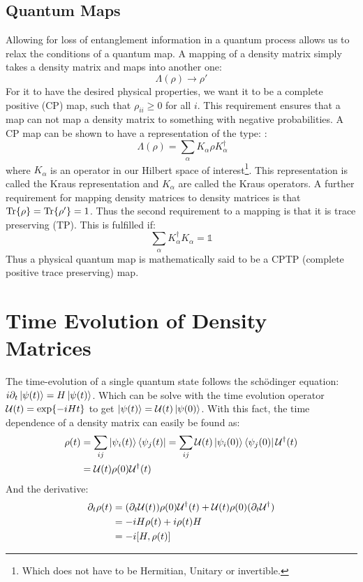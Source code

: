 \subsection{Quantum Maps}
Allowing for loss of entanglement information in a quantum process allows us to relax the conditions of a quantum map. A mapping of a density matrix simply takes a density matrix and maps into another one:
\begin{equation}
    \Lambda(\rho) \to \rho'
\end{equation}
For it to have the desired physical properties, we want it to be a complete positive (CP) map, such that $\rho_{ii} \geq 0$ for all $i$. This requirement ensures that a map can not map a density matrix to something with negative probabilities. A CP map can be shown to have a representation of the type: \cite{greenbaum_introduction_2015}:
\begin{equation}\
    \Lambda(\rho) = \sum_\alpha K_\alpha\rho K_\alpha^\dagger
\end{equation}
where $K_\alpha$ is an operator in our Hilbert space of interest\footnote{Which does not have to be Hermitian, Unitary or invertible.}. This representation is called the Kraus representation and $K_\alpha$ are called the Kraus operators. A further requirement for mapping density matrices to density matrices is that $\Tr{\rho} = \Tr{\rho'} = 1$. Thus the second requirement to a mapping is that it is trace preserving (TP). This is fulfilled if:
\begin{equation}
    \sum_\alpha K_\alpha^\dagger K_\alpha = \mathbb{1}
\end{equation}
Thus a physical quantum map is mathematically said to be a CPTP (complete positive trace preserving) map.  

\section{Time Evolution of Density Matrices}
The time-evolution of a single quantum state follows the schödinger equation: $i\partial_t\ket{\psi(t)} = H\ket{\psi(t)}$. Which can be solve with the time evolution operator $\mathcal{U}(t) = \exp{-iHt}$ to get $\ket{\psi(t)} = \mathcal{U}(t)\ket{\psi(0)}$. With this fact, the time dependence of a density matrix can easily be found as:
\begin{align}
    \rho(t) &= \sum_{ij} \ket{\psi_i(t)}\bra{\psi_j(t)} = \sum_{ij} \mathcal{U}(t) \ket{\psi_i(0)}\bra{\psi_j(0)} \mathcal{U}^\dagger(t) \nonumber \\
    &= \mathcal{U}(t) \rho(0) \mathcal{U}^\dagger(t)
\end{align}
And the derivative:
\begin{align}
    \partial_t \rho(t) &= (\partial_t \unitary(t)) \rho(0)\unitary^\dagger(t) + \unitary(t)\rho(0)(\partial_t \unitary^\dagger) \nonumber \\
    &= -iH \rho(t) +i \rho(t) H \nonumber \\
    &= - i \comm{H}{\rho(t)}
\end{align}


